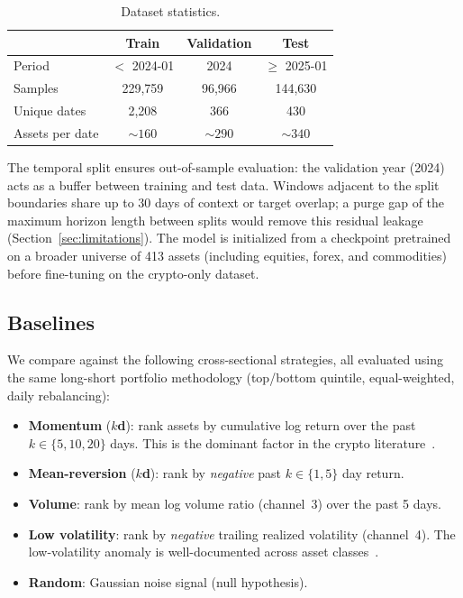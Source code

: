 \documentclass[sigconf]{acmart}
\begin{document}
\begin{table}[h]
\small
\centering
\caption{Dataset statistics.}
\label{tab:data}
\begin{tabular}{lccc}
\toprule
 & Train & Validation & Test \\
\midrule
Period & $<$ 2024-01 & 2024 & $\geq$ 2025-01 \\
Samples & 229,759 & 96,966 & 144,630 \\
Unique dates & 2,208 & 366 & 430 \\
Assets per date & $\sim\!160$ & $\sim\!290$ & $\sim\!340$ \\
\bottomrule
\end{tabular}
\end{table}

\noindent The temporal split ensures out-of-sample evaluation: the validation year (2024) acts as a buffer between training and test data.
Windows adjacent to the split boundaries share up to 30 days of context or target overlap; a purge gap of the maximum horizon length between splits would remove this residual leakage (Section~\ref{sec:limitations}).
The model is initialized from a checkpoint pretrained on a broader universe of 413 assets (including equities, forex, and commodities) before fine-tuning on the crypto-only dataset.

\subsection{Baselines}

We compare against the following cross-sectional strategies, all evaluated using the same long-short portfolio methodology (top/bottom quintile, equal-weighted, daily rebalancing):

\begin{itemize}
\item \textbf{Momentum} ($k$\textbf{d}): rank assets by cumulative log return over the past $k \in \{5, 10, 20\}$ days. This is the dominant factor in the crypto literature~\cite{liu2022}.
\item \textbf{Mean-reversion} ($k$\textbf{d}): rank by \emph{negative} past $k \in \{1, 5\}$ day return.
\item \textbf{Volume}: rank by mean log volume ratio (channel~3) over the past 5 days.
\item \textbf{Low volatility}: rank by \emph{negative} trailing realized volatility (channel~4). The low-volatility anomaly is well-documented across asset classes~\cite{ang2006}.
\item \textbf{Random}: Gaussian noise signal (null hypothesis).
\end{itemize}
\end{document}
